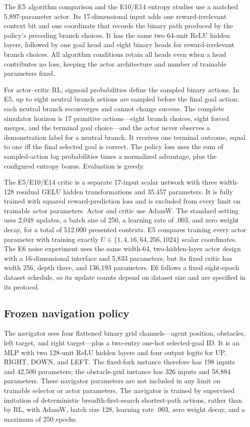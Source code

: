 The E5 algorithm comparison and the E10/E14 entropy studies use a matched 5,897-parameter actor. Its 17-dimensional input adds one reward-irrelevant context bit and one coordinate that records the binary path produced by the policy's preceding branch choices. It has the same two 64-unit ReLU hidden layers, followed by one goal head and eight binary heads for reward-irrelevant branch choices. All algorithm conditions retain all heads even when a head contributes no loss, keeping the actor architecture and number of trainable parameters fixed.

For actor--critic RL, sigmoid probabilities define the sampled binary actions. In E5, up to eight neutral branch actions are sampled before the final goal action; each neutral branch reconverges and cannot change success. The complete simulator horizon is 17 primitive actions---eight branch choices, eight forced merges, and the terminal goal choice---and the actor never observes a demonstration label for a neutral branch. It receives one terminal outcome, equal to one iff the final selected goal is correct. The policy loss uses the sum of sampled-action log probabilities times a normalized advantage, plus the configured entropy bonus. Evaluation is greedy.

The E5/E10/E14 critic is a separate 17-input scalar network with three width-128 residual GELU hidden transformations and 35,457 parameters. It is fully trained with squared reward-prediction loss and is excluded from every limit on trainable actor parameters. Actor and critic use AdamW. The standard setting uses 2,048 updates, a batch size of 250, a learning rate of $.003$, and zero weight decay, for a total of 512,000 presented contexts. E5 compares training every actor parameter with training exactly $U\in\{1,4,16,64,256,1024\}$ scalar coordinates. The E6 noise experiment uses the same width-64, two-hidden-layer actor design with a 16-dimensional interface and 5,833 parameters, but its fixed critic has width 256, depth three, and 136,193 parameters. E6 follows a fixed eight-epoch dataset schedule, so its update counts depend on dataset size and are specified in its protocol.

\subsection{Frozen navigation policy}

The navigator sees four flattened binary grid channels---agent position, obstacles, left target, and right target---plus a two-entry one-hot selected-goal ID. It is an MLP with two 128-unit ReLU hidden layers and four output logits for UP, RIGHT, DOWN, and LEFT. The fixed-fork instance therefore has 198 inputs and 42,500 parameters; the obstacle-grid instance has 326 inputs and 58,884 parameters. These navigator parameters are not included in any limit on trainable selector or actor parameters. The navigator is trained by supervised imitation of deterministic breadth-first-search shortest-path actions, rather than by RL, with AdamW, batch size 128, learning rate $.003$, zero weight decay, and a maximum of 250 epochs.

